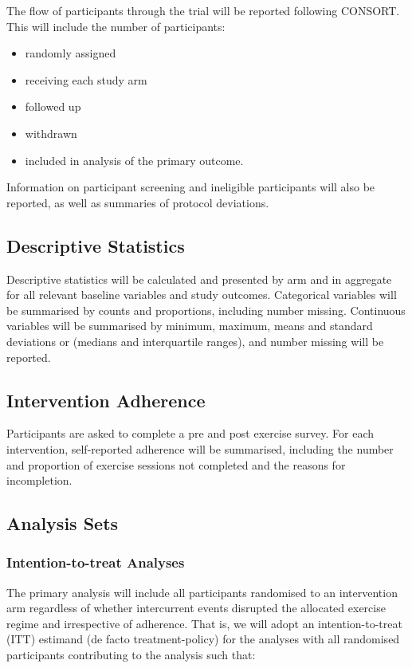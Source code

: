 \documentclass[11pt,parskip=half-]{scrartcl}
\providecommand{\tightlist}{%
  \setlength{\itemsep}{0pt}\setlength{\parskip}{0pt}}
\begin{document}
The flow of participants through the trial will be reported following CONSORT. This will include the number of participants:

\begin{itemize}
  \tightlist
  \item randomly assigned
  \item receiving each study arm
  \item followed up
  \item withdrawn
  \item included in analysis of the primary outcome.
\end{itemize}

Information on participant screening and ineligible participants will also be reported, as well as summaries of protocol deviations.

\subsection{Descriptive Statistics}\label{descriptive-statistics}

Descriptive statistics will be calculated and presented by arm and in aggregate for all relevant baseline variables and study outcomes. Categorical variables will be summarised by counts and proportions, including number missing. Continuous variables will be summarised by minimum, maximum, means and standard deviations or (medians and interquartile ranges), and number missing will be reported.

\subsection{Intervention Adherence}\label{adherence}

Participants are asked to complete a pre and post exercise survey. For each intervention, self-reported adherence will be summarised, including the number and proportion of exercise sessions not completed and the reasons for incompletion.

\subsection{Analysis Sets}\label{analysis-sets}

\subsubsection{Intention-to-treat Analyses}

The primary analysis will include all participants randomised to an intervention arm regardless of whether intercurrent events disrupted the allocated exercise regime and irrespective of adherence. That is, we will adopt an intention-to-treat (ITT) estimand (de facto treatment-policy) for the analyses with all randomised participants contributing to the analysis such that:
\end{document}
